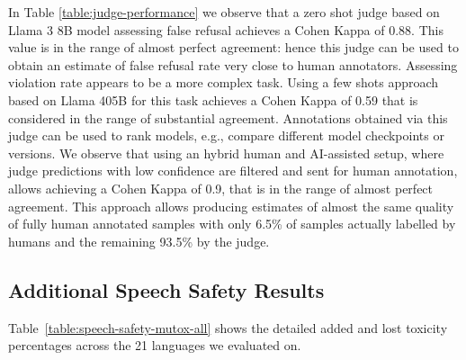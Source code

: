 In Table \ref{table:judge-performance} we observe that a zero shot judge based on Llama 3 8B model assessing false refusal achieves a Cohen Kappa of 0.88. This value is in the range of almost perfect agreement: hence this judge can be used to obtain an estimate of false refusal rate very close to human annotators.  Assessing violation rate appears to be a more complex task. Using a few shots approach based on Llama 405B for this task achieves a Cohen Kappa of 0.59 that is considered in the range of substantial agreement. Annotations obtained via this judge can be used to rank models, e.g., compare different model checkpoints or versions. We observe that using an hybrid human and AI-assisted setup, where judge predictions with low confidence are filtered and sent for human annotation, allows achieving a Cohen Kappa of 0.9, that is in the range of almost perfect agreement. This approach allows producing estimates of almost the same quality of fully human annotated samples with only 6.5\% of samples actually labelled by humans and the remaining 93.5\% by the judge.


\subsection{Additional Speech Safety Results}

Table~\ref{table:speech-safety-mutox-all} shows the detailed added and lost toxicity percentages across the 21 languages we evaluated on.



\providecommand{\bup}{($\boldsymbol\uparrow$)}
\providecommand{\bdown}{($\boldsymbol\downarrow$)}


